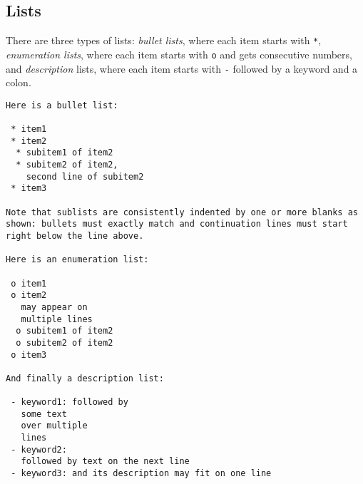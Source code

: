 \documentclass[%
oneside,                 %
final,                   %
10pt]{article}
\begin{document}
\subsection{Lists}
There are three types of lists: \emph{bullet lists}, where each item starts
with \texttt{*}, \emph{enumeration lists}, where each item starts with \texttt{o} and gets
consecutive numbers,
and \emph{description} lists, where each item starts with \texttt{-} followed
by a keyword and a colon.
\begin{Verbatim}[numbers=none,fontsize=\fontsize{9pt}{9pt},baselinestretch=0.95,xleftmargin=2mm]
Here is a bullet list:

 * item1
 * item2
  * subitem1 of item2
  * subitem2 of item2,
    second line of subitem2
 * item3

Note that sublists are consistently indented by one or more blanks as
shown: bullets must exactly match and continuation lines must start
right below the line above.

Here is an enumeration list:

 o item1
 o item2
   may appear on
   multiple lines
  o subitem1 of item2
  o subitem2 of item2
 o item3

And finally a description list:

 - keyword1: followed by
   some text
   over multiple
   lines
 - keyword2:
   followed by text on the next line
 - keyword3: and its description may fit on one line

\end{Verbatim}
\end{document}
